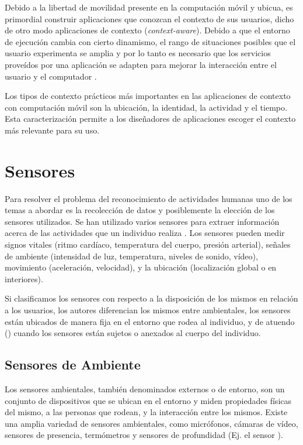 Debido a la libertad de movilidad presente en la computación móvil
y ubicua, es primordial construir aplicaciones que conozcan el contexto
de sus usuarios, dicho de otro modo aplicaciones de contexto (\emph{context-aware}).
Debido a que el entorno de ejecución cambia con cierto dinamismo,
el rango de situaciones posibles que el usuario experimenta se amplia
y por lo tanto es necesario que los servicios proveídos por una aplicación
se adapten para mejorar la interacción entre el usuario y el computador
\cite{Dey2000}.

Los tipos de contexto prácticos más importantes en las aplicaciones
de contexto con computación móvil son la ubicación, la identidad,
la actividad y el tiempo. Esta caracterización permite a los diseñadores
de aplicaciones escoger el contexto más relevante para su uso.

\section{Sensores}

\label{sec23:sensores} Para resolver el problema del reconocimiento
de actividades humanas uno de los temas a abordar es la recolección
de datos y posiblemente la elección de los sensores utilizados. Se
han utilizado varios sensores para extraer información acerca de las
actividades que un individuo realiza \cite{Chen2012,LaraLabrador2012}.
Los sensores pueden medir signos vitales (ritmo cardíaco, temperatura
del cuerpo, presión arterial), señales de ambiente (intensidad de
luz, temperatura, niveles de sonido, vídeo), movimiento (aceleración,
velocidad), y la ubicación (localización global o en interiores). 

Si clasificamos los sensores con respecto a la disposición de los
mismos en relación a los usuarios, los autores \cite{ReyesOrtiz2015,LaraLabrador2013}
diferencian los mismos entre ambientales, los sensores están ubicados
de manera fija en el entorno que rodea al individuo, y de atuendo
(\emph{}) cuando los sensores están sujetos o anexados
al cuerpo del individuo.

\subsection{Sensores de Ambiente}

Los sensores ambientales, también denominados externos o de entorno,
son un conjunto de dispositivos que se ubican en el entorno y miden
propiedades físicas del mismo, a las personas que rodean, y la interacción
entre los mismos. Existe una amplia variedad de sensores ambientales,
como micrófonos, cámaras de vídeo, sensores de presencia, termómetros
y sensores de profundidad (Ej. el sensor \emph{}). 

